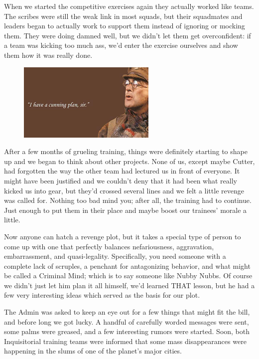 When we started the competitive exercises again they actually worked like teams. 
The scribes were still the weak link in most squads, but their squadmates and leaders began to actually work to support them instead of ignoring or mocking them. 
They were doing damned well, but we didn’t let them get overconfident: 
if a team was kicking too much ass, we’d enter the exercise ourselves and show them how it was really done.

\begin{figure}
	\begin{center}
		\includegraphics[width=\figwidth]{pics/8/26.png}
	\end{center}
\end{figure}
After a few months of grueling training, things were definitely starting to shape up and we began to think about other projects. 
None of us, except maybe Cutter, had forgotten the way the other team had lectured us in front of everyone. 
It might have been justified and we couldn’t deny that it had been what really kicked us into gear, but they’d crossed several lines and we felt a little revenge was called for. 
Nothing too bad mind you; 
after all, the training had to continue. 
Just enough to put them in their place and maybe boost our trainees’ morale a little.

Now anyone can hatch a revenge plot, but it takes a special type of person to come up with one that perfectly balances nefariousness, aggravation, embarrassment, and quasi-legality. 
Specifically, you need someone with a complete lack of scruples, a penchant for antagonizing behavior, and what might be called a Criminal Mind; 
which is to say someone like Nubby Nubbs. 
Of course we didn’t just let him plan it all himself, we’d learned THAT lesson, but he had a few very interesting ideas which served as the basis for our plot.

The Admin was asked to keep an eye out for a few things that might fit the bill, and before long we got lucky. 
A handful of carefully worded messages were sent, some palms were greased, and a few interesting rumors were started. 
Soon, both Inquisitorial training teams were informed that some mass disappearances were happening in the slums of one of the planet’s major cities. 


